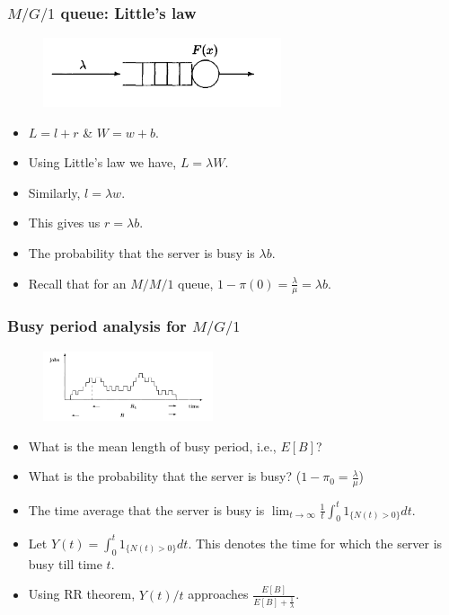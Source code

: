 \documentclass{beamer}
\def \mp {\pause}
\def \mp {}
\newcommand{\ft}[1]{\frametitle{#1}}
\begin{document}
\begin{frame}
 \ft{$M/G/1$ queue: Little's law}
\begin{figure}
\includegraphics[width=7cm]{mgone}
\centering
\end{figure}
\begin{itemize}\setlength\itemsep{.8em}
\mp \item $L =  l+r$ \& $W = w + b.$
\mp \item Using Little's law we have, $L = \lambda W$.
\mp  \item Similarly, $l = \lambda w$.
\mp \item This gives us $r = \lambda b$.
\mp \item The probability that the server is busy is $\lambda b$.

\mp\item Recall that for an $M/M/1$ queue, $1-\pi(0) = \frac{\lambda}{\mu} = \lambda b$.

\end{itemize}
\end{frame}



\begin{frame}
 \ft{Busy period analysis for $M/G/1$}
   \begin{figure}
\includegraphics[width=5cm]{busy}
\centering
\end{figure}
\begin{itemize}\setlength\itemsep{.7em}
\mp  \item What is the mean length of busy period, i.e., $E[B]$?
\mp \item What is the probability that the server is busy? \mp ($1-\pi_0 = \frac{\lambda}{\mu}$)
\mp\item The time average that the server is busy is  $\lim_{t\rightarrow \infty}\frac{1}{t}\int_0^t 1_{\{N(t)>0\}}dt$.
\mp \item Let $Y(t) = \int_0^t 1_{\{N(t)>0\}}dt$. \mp This denotes the time for which the server is busy till time $t$.
\mp\item Using RR theorem, $Y(t)/t$ approaches $\frac{E[B]}{E[B] + \frac{1}{\lambda}}$.
 \end{itemize}
\end{frame}   
 
\end{document}
